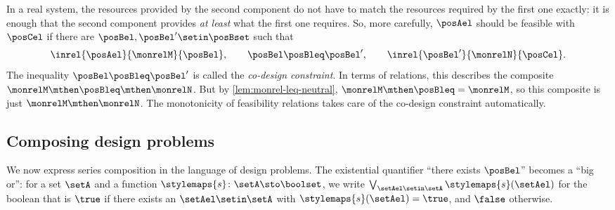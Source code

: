 \begin{remark}
    \label{rem:codesign-constraint}
    In a real system, the resources provided by the second component do not have to match the resources required by the first one exactly: it is enough that the second component provides \emph{at least} what the first one requires.
    So, more carefully, $\posAel$ should be feasible with $\posCel$ if there are $\posBel, \posBel' \setin \posBset$ such that
    \begin{equation}
        \inrel{\posAel}{\monrelM}{\posBel},
        \qquad
        \posBel \posBleq \posBel',
        \qquad
        \inrel{\posBel'}{\monrelN}{\posCel}.
    \end{equation}
    The inequality $\posBel \posBleq \posBel'$ is called the \emph{co-design constraint}.
    In terms of relations, this describes the composite $\monrelM \mthen \posBleq \mthen \monrelN$.
    But by \cref{lem:monrel-leq-neutral}, $\monrelM \mthen \posBleq = \monrelM$, so this composite is just $\monrelM \mthen \monrelN$.
    The monotonicity of feasibility relations takes care of the co-design constraint automatically.
\end{remark}

\subsection{Composing design problems}

We now express series composition in the language of design problems.
The existential quantifier ``there exists $\posBel$'' becomes a ``big or'': for a set $\setA$ and a function $\stylemaps{s} \colon \setA \sto \boolset$, we write $\bigvee_{\setAel \setin \setA} \stylemaps{s}(\setAel)$ for the boolean that is $\true$ if there exists an $\setAel \setin \setA$ with $\stylemaps{s}(\setAel) = \true$, and $\false$ otherwise.

